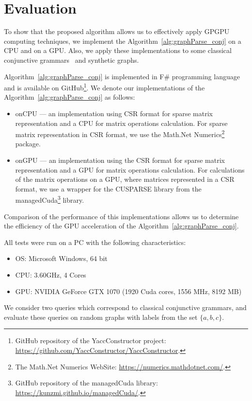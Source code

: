 \section{Evaluation} \label{section_evaluation}
To show that the proposed algorithm allows us to effectively apply GPGPU computing techniques, we implement the Algorithm~\ref{alg:graphParse_conj} on a CPU and on a GPU. Also, we apply these implementations to some classical conjunctive grammars~\cite{okhotin2001conjunctive} and synthetic graphs.

Algorithm~\ref{alg:graphParse_conj} is implemented in F\# programming language~\cite{fsharp} and is available on GitHub\footnote{GitHub repository of the YaccConstructor project: \url{https://github.com/YaccConstructor/YaccConstructor}.}. We denote our implementations of the Algorithm~\ref{alg:graphParse_conj} as follows:
\begin{itemize}
    \item onCPU --- an implementation using CSR format for sparse matrix representation and a CPU for matrix operations calculation. For sparse matrix representation in CSR format, we use the Math.Net Numerics\footnote{The Math.Net Numerics WebSite: \url{https://numerics.mathdotnet.com/}.} package.
    \item onGPU --- an implementation using the CSR format for sparse matrix representation and a GPU for matrix operations calculation. For calculations of the matrix operations on a GPU, where matrices represented in a CSR format, we use a wrapper for the CUSPARSE library from the managedCuda\footnote{GitHub repository of the managedCuda library: \url{https://kunzmi.github.io/managedCuda/}.} library.
\end{itemize}

Comparison of the performance of this implementations allows us to determine the efficiency of the GPU acceleration of the Algorithm~\ref{alg:graphParse_conj}.

All tests were run on a PC with the following characteristics:
\begin{itemize}
    \item OS: Microsoft Windows, 64 bit
    \item CPU: 3.60GHz, 4 Cores
    \item GPU: NVIDIA GeForce GTX 1070 (1920 Cuda cores, 1556 MHz, 8192 MB)
\end{itemize}

We consider two queries which correspond to classical conjunctive grammars, and evaluate these queries on random graphs with labels from the set $\{a,b,c\}$.

